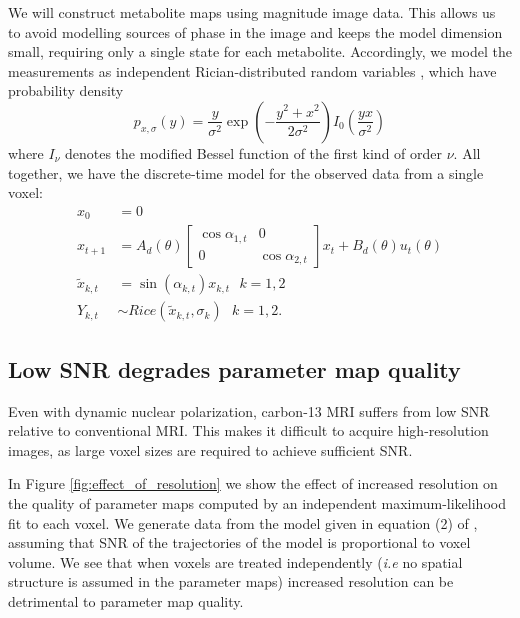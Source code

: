 \documentclass{article}
\begin{document}
We will construct metabolite maps using magnitude image data. This allows us to avoid modelling sources of phase in the image and keeps the model dimension small, requiring only a single state for each metabolite. Accordingly, we model the measurements as independent Rician-distributed random variables \cite{Gudbjartsson95}, which have probability density
\[
   p_{x, \sigma}(y) =  \frac{y}{\sigma^2} \exp\left( - \frac{y^2 + x^2}{2 \sigma^2} \right) I_0\left(\frac{y x}{\sigma^2} \right)
\]
where $I_\nu$ denotes the modified Bessel function of the first kind of order $\nu$.  All together, we have the discrete-time model for the observed data from a single voxel: 
\begin{equation}
\begin{split}
  x_0 &= 0 \\
  x_{t+1} &= A_d(\theta) \left[\begin{array}{cc} \cos \alpha_{1,t} & 0 \\  0 & \cos \alpha_{2, t} \end{array}\right]  x_t + B_d(\theta) u_t(\theta)  \\
 \tilde{x}_{k, t} &= \sin(\alpha_{k, t}) x_{k, t} \ \ \ k=1, 2 \\
  Y_{k, t} &\sim Rice(\tilde x_{k, t}, \sigma_k ) \ \ \ k = 1, 2. 
\end{split}
\label{eq:model}
\end{equation}


\subsection{Low SNR degrades parameter map quality} 

Even with dynamic nuclear polarization, carbon-13 MRI suffers from low SNR relative to conventional MRI. This makes it difficult to acquire high-resolution images, as large voxel sizes are required to achieve sufficient SNR. 

In Figure \ref{fig:effect_of_resolution} we show the effect of increased resolution on the quality of parameter maps computed by an independent maximum-likelihood fit to each voxel. We generate data from the model given in equation (2) of \cite{Maidens16}, assuming that SNR of the trajectories of the model is proportional to voxel volume. We see that when voxels are treated independently (\emph{i.e} no spatial structure is assumed in the parameter maps) increased resolution can be detrimental to parameter map quality. 
\end{document}
